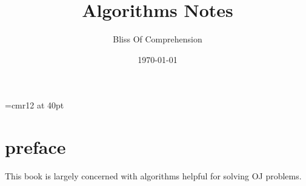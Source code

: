 \documentclass[a4paper,12pt]{report}
\begin{document}
\font\TitleF=cmr12 at 40pt
\title{\TitleF Algorithms Notes}
\author{Bliss Of Comprehension}
\date{\today}
\maketitle

\tableofcontents

\chapter*{preface}

This book is largely concerned with algorithms helpful for solving OJ problems. 




\end{document}
